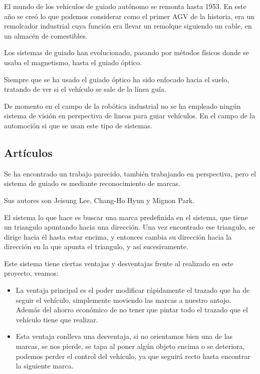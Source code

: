 El mundo de los vehículos de guiado autónomo se remonta hasta 1953. En este año se creó lo que podemos considerar como el primer AGV de la historia, era un remolcador industrial cuya función era llevar un remolque siguiendo un cable, en un almacén de comestibles\cite{primer_agv}. 

Los sistemas de guiado han evolucionado, pasando por métodos físicos donde se usaba el magnetismo, hasta el guiado óptico. 

Siempre que se ha usado el guiado óptico ha sido enfocado hacia el suelo, tratando de ver si el vehículo se sale de la línea guía.



De momento en el campo de la robótica industrial no se ha empleado ningún sistema de visión en perspectiva de lineas para guiar vehículos. En el campo de la automoción si que se usan este tipo de sistemas.

\subsection{Artículos}

Se ha encontrado un trabajo parecido, también trabajando en perspectiva, pero el sistema de guiado es mediante reconocimiento de marcas\cite{guiado_marcas}.

Sus autores son Jeisung Lee, Chang-Ho Hyun y Mignon Park. 

El sistema lo que hace es buscar una marca predefinida en el sistema, que tiene un triangulo apuntando hacia una dirección. Una vez encontrado ese triangulo, se dirige hacia él hasta estar encima, y entonces cambia su dirección hacia la dirección en la que apunta el triangulo, y así sucesivamente.

Este sistema tiene ciertas ventajas y desventajas frente al realizado en este proyecto, veamos:

\begin{itemize}
	\item La ventaja principal es el poder modificar rápidamente el trazado que ha de seguir el vehículo, simplemente moviendo las marcas a nuestro antojo. Además del ahorro económico de no tener que pintar todo el trazado que el vehículo tiene que realizar.
	
	\item Esta ventaja conlleva una desventaja, si no orientamos bien una de las marcas, se nos pierde, se tapa al poner algún objeto encima o se deteriora, podemos perder el control del vehículo, ya que seguirá recto hasta encontrar la siguiente marca.
	
\end{itemize}

